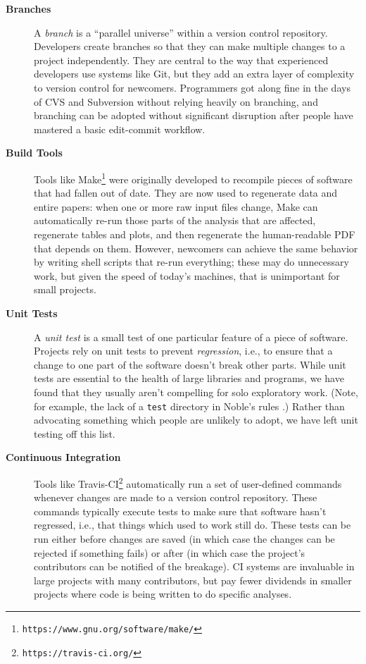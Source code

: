 \documentclass[10pt,letterpaper]{article}
\newcommand{\withurl}[2]{{#1}\footnote{{\texttt{#2}}}}
\begin{document}
\begin{description}

\item[\textbf{Branches}] A \emph{branch} is a ``parallel universe''
  within a version control repository. Developers create branches so
  that they can make multiple changes to a project independently. They
  are central to the way that experienced developers use systems like
  Git, but they add an extra layer of complexity to version control
  for newcomers.  Programmers got along fine in the days of CVS and
  Subversion without relying heavily on branching, and branching can
  be adopted without significant disruption after people have mastered
  a basic edit-commit workflow.

\item[\textbf{Build Tools}] Tools like
  \withurl{Make}{https://www.gnu.org/software/make/} were originally
  developed to recompile pieces of software that had fallen out of
  date. They are now used to regenerate data and entire papers: when
  one or more raw input files change, Make can automatically re-run
  those parts of the analysis that are affected, regenerate tables and
  plots, and then regenerate the human-readable PDF that depends on
  them.  However, newcomers can achieve the same behavior by writing
  shell scripts that re-run everything; these may do unnecessary work,
  but given the speed of today's machines, that is unimportant for
  small projects.

\item[\textbf{Unit Tests}] A \emph{unit test} is a small test of one
  particular feature of a piece of software. Projects rely on unit
  tests to prevent \emph{regression}, i.e., to ensure that a change to
  one part of the software doesn't break other parts. While unit tests
  are essential to the health of large libraries and programs, we have
  found that they usually aren't compelling for solo exploratory
  work. (Note, for example, the lack of a \texttt{test} directory in
  Noble's rules \cite{noble2009}.)  Rather than advocating something
  which people are unlikely to adopt, we have left unit testing off
  this list.

\item[\textbf{Continuous Integration}] Tools like
  \withurl{Travis-CI}{https://travis-ci.org/} automatically run a set
  of user-defined commands whenever changes are made to a version
  control repository. These commands typically execute tests to make
  sure that software hasn't regressed, i.e., that things which used to
  work still do. These tests can be run either before changes are
  saved (in which case the changes can be rejected if something fails)
  or after (in which case the project's contributors can be notified
  of the breakage). CI systems are invaluable in large projects with
  many contributors, but pay fewer dividends in smaller projects where
  code is being written to do specific analyses.


\end{description}
\end{document}
